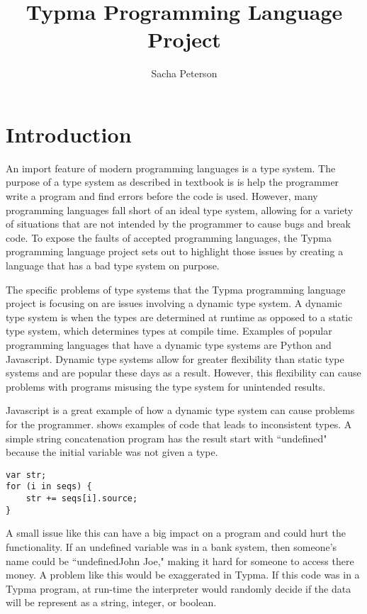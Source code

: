 \documentclass[10pt,twocolumn]{article}
\title{Typma Programming Language Project}
\author{Sacha Peterson}
\affiliation{Occidental College}
\begin{document}
\maketitle

\section{Introduction}

An import feature of modern programming languages is a type system. The purpose of a type system as described in textbook is is help the programmer write a program and find errors before the code is used. However, many programming languages fall short of an ideal type system, allowing for a variety of situations that are not intended by the programmer to cause bugs and break code. To expose the faults of accepted programming languages, the Typma programming language project sets out to highlight those issues by creating a language that has a bad type system on purpose.

The specific problems of type systems that the Typma programming language project is focusing on are issues involving a dynamic type system. A dynamic type system is when the types are determined at runtime as opposed to a static type system, which determines types at compile time. Examples of popular programming languages that have a dynamic type systems are Python and Javascript. Dynamic type systems allow for greater flexibility than static type systems and are popular these days as a result. However, this flexibility can cause problems with programs misusing the type system for unintended results.

Javascript is a great example of how a dynamic type system can cause problems for the programmer. \textcite{Pradel2014TypeDevil} shows examples of code that leads to inconsistent types. A simple string concatenation program has the result start with ``undefined" because the initial variable was not given a type.

\begin{lstlisting}
var str;
for (i in seqs) {
	str += seqs[i].source;
}
\end{lstlisting}

A small issue like this can have a big impact on a program and could hurt the functionality. If an undefined variable was in a bank system, then someone's name could be ``undefinedJohn Joe," making it hard for someone to access there money. A problem like this would be exaggerated in Typma. If this code was in a Typma program, at run-time the interpreter would randomly decide if the data will be represent as a string, integer, or boolean.
\end{document}
